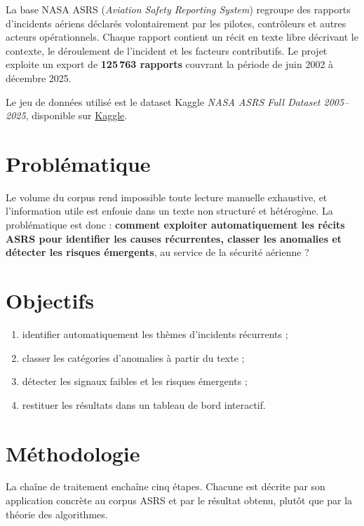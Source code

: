 \documentclass[11pt,a4paper]{article}
\begin{document}
La base NASA ASRS (\emph{Aviation Safety Reporting System}) regroupe des rapports
d'incidents aériens déclarés volontairement par les pilotes, contrôleurs et autres acteurs
opérationnels. Chaque rapport contient un récit en texte libre décrivant le contexte, le
déroulement de l'incident et les facteurs contributifs. Le projet exploite un export de
\textbf{125\,763 rapports} couvrant la période de juin 2002 à décembre 2025.

Le jeu de données utilisé est le dataset Kaggle \emph{NASA ASRS Full Dataset 2005--2025},
disponible sur
\href{https://www.kaggle.com/datasets/mnhagemann21/nasa-asrs-full-dataset-20052025}{Kaggle}.

\section{Problématique}

Le volume du corpus rend impossible toute lecture manuelle exhaustive, et l'information utile
est enfouie dans un texte non structuré et hétérogène. La problématique est donc :
\textbf{comment exploiter automatiquement les récits ASRS pour identifier les causes
récurrentes, classer les anomalies et détecter les risques émergents}, au service de la
sécurité aérienne ?

\section{Objectifs}

\begin{enumerate}
  \item identifier automatiquement les thèmes d'incidents récurrents ;
  \item classer les catégories d'anomalies à partir du texte ;
  \item détecter les signaux faibles et les risques émergents ;
  \item restituer les résultats dans un tableau de bord interactif.
\end{enumerate}

\section{Méthodologie}

La chaîne de traitement enchaîne cinq étapes. Chacune est décrite par son application
concrète au corpus ASRS et par le résultat obtenu, plutôt que par la théorie des algorithmes.
\end{document}
